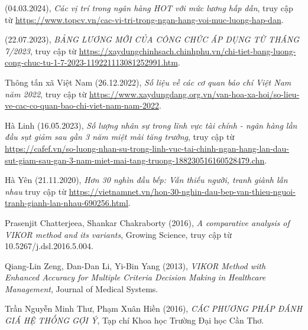 \begin{thebibliography}{99}
    (04.03.2024),
    \emph{Các vị trí trong ngân hàng HOT với mức lương hấp dẫn},
    truy cập từ \href{https://www.topcv.vn/cac-vi-tri-trong-ngan-hang-voi-muc-luong-hap-dan#:~:text=Giao%20d%E1%BB%8Bch%20vi%C3%AAn%20ng%C3%A2n%20h%C3%A0ng%20c%C3%B3%20m%E1%BB%A9c%20l%C6%B0%C6%A1ng%20trung%20b%C3%ACnh,nh%E1%BA%ADt%20m%E1%BB%9Bi%20nh%E1%BA%A5t%20t%E1%BA%A1i%20TopCV! }{\color{black}https://www.topcv.vn/cac-vi-tri-trong-ngan-hang-voi-muc-luong-hap-dan}.

    (22.07.2023),
    \emph{BẢNG LƯƠNG MỚI CỦA CÔNG CHỨC ÁP DỤNG TỪ THÁNG 7/2023},
    truy cập từ \href{https://xaydungchinhsach.chinhphu.vn/chi-tiet-bang-luong-cong-chuc-tu-1-7-2023-119221113081252991.htm}{\color{black}https://xaydungchinhsach.chinhphu.vn/chi-tiet-bang-luong-cong-chuc-tu-1-7-2023-119221113081252991.htm}.

    Thông tấn xã Việt Nam (26.12.2022),
    \emph{Số liệu về các cơ quan báo chí Việt Nam năm 2022},
    truy cập từ \href{https://www.xaydungdang.org.vn/van-hoa-xa-hoi/so-lieu-ve-cac-co-quan-bao-chi-viet-nam-nam-2022-18260#:~:text=thanh%2C%20truy%E1%BB%81n%20h%C3%ACnh.-,N%C4%83m%202022%2C%20c%E1%BA%A3%20n%C6%B0%E1%BB%9Bc%20c%C3%B3%20127%20c%C6%A1%20quan%20b%C3%A1o%3B%20670,h%C3%ACnh%20x%E1%BA%A5p%20x%E1%BB%89%2016.500%20ng%C6%B0%E1%BB%9Di}{\color{black}https://www.xaydungdang.org.vn/van-hoa-xa-hoi/so-lieu-ve-cac-co-quan-bao-chi-viet-nam-nam-2022}.
    
    Hà Linh (16.05.2023),
    \emph{Số lượng nhân sự trong lĩnh vực tài chính - ngân hàng lần đầu sụt giảm sau gần 3 năm miệt mài tăng trưởng},
    truy cập từ \href{https://cafef.vn/so-luong-nhan-su-trong-linh-vuc-tai-chinh-ngan-hang-lan-dau-sut-giam-sau-gan-3-nam-miet-mai-tang-truong-188230516160528479.chn}{\color{black}https://cafef.vn/so-luong-nhan-su-trong-linh-vuc-tai-chinh-ngan-hang-lan-dau-sut-giam-sau-gan-3-nam-miet-mai-tang-truong-188230516160528479.chn}.

    Hà Yên (21.11.2020),
    \emph{Hơn 30 nghìn đầu bếp: Vẫn thiếu người, tranh giành lẫn nhau}
    truy cập từ \href{https://vietnamnet.vn/hon-30-nghin-dau-bep-van-thieu-nguoi-tranh-gianh-lan-nhau-690256.html#:~:text=Vi%E1%BB%87t%20Nam%20hi%E1%BB%87n%20c%C3%B3%20kho%E1%BA%A3ng,th%E1%BB%B1c%20Vi%E1%BB%87t%20ra%20th%E1%BA%BF%20gi%E1%BB%9Bi}{\color{black}https://vietnamnet.vn/hon-30-nghin-dau-bep-van-thieu-nguoi-tranh-gianh-lan-nhau-690256.html}.

    Prasenjit Chatterjeea, Shankar Chakraborty (2016),
    \emph{A comparative analysis of VIKOR method and its variants},
    Growing Science,
    truy cập từ 10.5267/j.dsl.2016.5.004.

    Qiang-Lin Zeng, Dan-Dan Li, Yi-Bin Yang (2013),
    \emph{VIKOR Method with Enhanced Accuracy for Multiple Criteria Decision Making in Healthcare Management},
    Journal of Medical Systems.

    Trần Nguyễn Minh Thư, Phạm Xuân Hiền (2016),
    \emph{CÁC PHƯƠNG PHÁP ĐÁNH GIÁ HỆ THỐNG GỢI Ý},
    Tạp chí Khoa học Trường Đại học Cần Thơ.
\end{thebibliography}